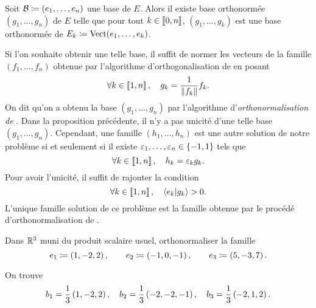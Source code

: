 \documentclass{magnolia}
\begin{document}
\begin{proposition}[nom={Algorithme d'orthonormalisation de \nom{Gram-Schmidt}}]
Soit $\mathcal{B}\coloneqq(e_1,\ldots,e_n)$ une base de $E$. Alors il existe base
orthonormée $(g_1,\ldots,g_n)$ de $E$ telle que pour tout
$k\in\left\llbracket 0,n\right\rrbracket$,
$(g_1,\ldots,g_k)$ est une base orthonormée de $E_k\coloneqq\operatorname{Vect}(e_1,\ldots,e_k)$.
\end{proposition}

\begin{remarques}
\remarque Si l'on souhaite obtenir une telle base,
  il suffit de normer les vecteurs de la famille $(f_1,\ldots,f_n)$
  obtenue par l'algorithme d'orthogonalisation de  en posant
  \[\forall k\in\left\llbracket 1,n\right\rrbracket,\quad g_k=\frac{1}{\left\|f_k\right\|}f_k.\]
  On dit qu'on a obtenu la base $(g_1,\ldots,g_n)$ par l'algorithme
  d'\emph{orthonormalisation de }.
\remarque Dans la proposition précédente, il n'y a pas unicité d'une telle base
  $(g_1,\ldots,g_n)$. Cependant, une famille $(h_1,\ldots,h_n)$ est une autre solution
  de notre problème si et seulement si il existe $\varepsilon_1,\ldots,\varepsilon_n\in\left\{-1,1\right\}$ tels
  que
  \[\forall k\in\left\llbracket 1,n\right\rrbracket,\quad h_k=\varepsilon_k g_k.\]
\remarque Pour avoir l'unicité, il suffit de rajouter la condition
  \[\forall k\in\left\llbracket 1,n\right\rrbracket,\quad \left\langle {e_k}\middle|{g_k}\right\rangle>0.\]
  L'unique famille solution de ce problème est la famille obtenue par le procédé
  d'orthonormalisation de .
\end{remarques}


\begin{exoUnique}
\exo Dans $\mathbb{R}^3$ muni du produit scalaire usuel, orthonormaliser la
  famille
  \[e_1\coloneqq\left(1,-2,2\right), \qquad e_2\coloneqq\left(-1,0,-1\right), \qquad e_3\coloneqq\left(5,-3,7\right).\]
  \begin{sol}
  On trouve
  \[b_1=\frac{1}{3}\left(1,-2,2\right), \quad b_2=\frac{1}{3}\left(-2,-2,-1\right), \quad
    b_3=\frac{1}{3}\left(-2,1,2\right).\]
  \end{sol}
\end{exoUnique}

\end{document}
